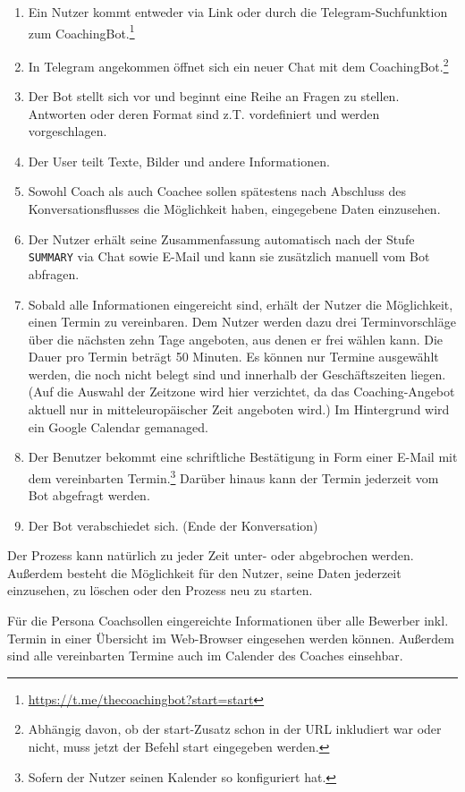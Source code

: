 	\begin{enumerate}
		\item Ein Nutzer kommt entweder via Link oder durch die Telegram-Suchfunktion zum CoachingBot.\footnote{\url{https://t.me/thecoachingbot?start=start}}
		\item In Telegram angekommen öffnet sich ein neuer Chat mit dem CoachingBot.\footnote{Abhängig davon, ob der start-Zusatz schon in der URL inkludiert war oder nicht, muss jetzt der Befehl \/start eingegeben werden.}
		\item Der Bot stellt sich vor und beginnt eine Reihe an Fragen zu stellen. Antworten oder deren Format sind z.T. vordefiniert und werden vorgeschlagen.
		\item Der User teilt Texte, Bilder und andere Informationen.
        \item Sowohl Coach als auch Coachee sollen spätestens nach Abschluss des Konversationsflusses die Möglichkeit haben, eingegebene Daten einzusehen.
        \item Der Nutzer erhält seine Zusammenfassung automatisch nach der Stufe \verb|SUMMARY| via Chat sowie E-Mail und kann sie zusätzlich manuell vom Bot abfragen.
        \item Sobald alle Informationen eingereicht sind, erhält der Nutzer die Möglichkeit, einen Termin zu vereinbaren. Dem Nutzer werden dazu drei Terminvorschläge über die nächsten zehn Tage angeboten, aus denen er frei wählen kann. Die Dauer pro Termin beträgt 50 Minuten. Es können nur Termine ausgewählt werden, die noch nicht belegt sind und innerhalb der Geschäftszeiten liegen. (Auf die Auswahl der Zeitzone wird hier verzichtet, da das Coaching-Angebot aktuell nur in mitteleuropäischer Zeit angeboten wird.) Im Hintergrund wird ein Google Calendar gemanaged.
        \item Der Benutzer bekommt eine schriftliche Bestätigung in Form einer E-Mail mit dem vereinbarten Termin.\footnote{Sofern der Nutzer seinen Kalender so konfiguriert hat.} Darüber hinaus kann der Termin jederzeit vom Bot abgefragt werden.
        \item Der Bot verabschiedet sich. (Ende der Konversation)

    \end{enumerate}
	Der Prozess kann natürlich zu jeder Zeit unter- oder abgebrochen werden. Außerdem besteht die Möglichkeit für den Nutzer, seine Daten jederzeit einzusehen, zu löschen oder den Prozess neu zu starten.

	Für die Persona \glqq Coach\grqq  sollen eingereichte Informationen über alle Bewerber inkl. Termin in einer Übersicht im Web-Browser eingesehen werden können. Außerdem sind alle vereinbarten Termine auch im Calender des Coaches einsehbar.


